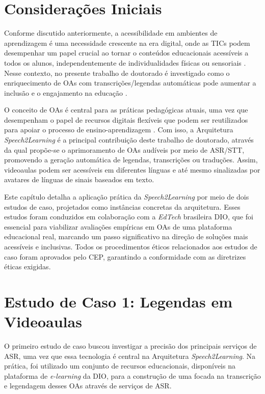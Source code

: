 \section{Considerações Iniciais}

Conforme discutido anteriormente, a acessibilidade em ambientes de aprendizagem é uma necessidade crescente na era digital, onde as TICs podem desempenhar um papel crucial ao tornar o conteúdos educacionais acessíveis a todos os alunos, independentemente de individualidades físicas ou sensoriais \cite{Mayer2021}. Nesse contexto, no presente trabalho de doutorado é investigado como o enriquecimento de OAs com transcrições/legendas automáticas pode aumentar a inclusão e o engajamento na educação \cite{FalvoJr2023_HICSS,FalvoJr2024_FIE}.

O conceito de OAs é central para as práticas pedagógicas atuais, uma vez que desempenham o papel de recursos digitais flexíveis que podem ser reutilizados para apoiar o processo de ensino-aprendizagem \cite{Parakh2022}. Com isso, a Arquitetura \textit{Speech2Learning} é a principal contribuição deste trabalho de doutorado, através da qual propõe-se o aprimoramento de OAs audíveis por meio de ASR/STT, promovendo a geração automática de legendas, transcrições ou traduções. Assim, videoaulas podem ser acessíveis em diferentes línguas e até mesmo sinalizadas por avatares de línguas de sinais baseados em texto.

Este capítulo detalha a aplicação prática da \textit{Speech2Learning} por meio de dois estudos de caso, projetados como instâncias concretas da arquitetura. Esses estudos foram conduzidos em colaboração com a \textit{EdTech} brasileira DIO, que foi essencial para viabilizar avaliações empíricas em OAs de uma plataforma educacional real, marcando um passo significativo na direção de soluções mais acessíveis e inclusivas. Todos os procedimentos éticos relacionados aos estudos de caso foram aprovados pelo CEP, garantindo a conformidade com as diretrizes éticas exigidas.

\section{Estudo de Caso 1: Legendas em Videoaulas}

O primeiro estudo de caso buscou investigar a precisão dos principais serviços de ASR, uma vez que essa tecnologia é central na Arquitetura \textit{Speech2Learning}. Na prática, foi utilizado um conjunto de recursos educacionais, disponíveis na plataforma de \textit{e-learning} da DIO, para a construção de uma  focada na transcrição e legendagem desses OAs através de serviços de ASR.

